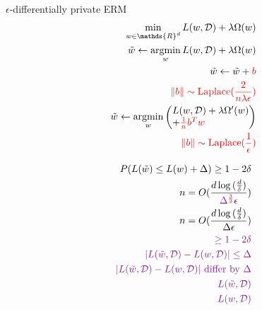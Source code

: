 \documentclass[11pt]{article}
\newcommand{\Dc}{\mathcal{D}}
\newcommand{\R}{\mathds{R}}
\DeclareMathOperator*{\argmin}{argmin}
\DeclarePairedDelimiter{\norm}{\lVert}{\rVert}
\DeclarePairedDelimiter{\abs}{\lvert}{\rvert}
\begin{document}
$\epsilon$-differentially private ERM
\begin{align*}
\min_{w\in \R^d} L(w, \Dc) + \lambda \Omega(w)\\
\tilde{w} \leftarrow \argmin_{w} L(w, \Dc) + \lambda \Omega(w)\\
\tilde{w} \leftarrow \tilde{w} +{\color{red} b}\\
\color{red}\norm{b}\sim \text{Laplace}(\frac{2}{n\lambda\epsilon})\\
\tilde{w} \leftarrow \argmin_w \begin{pmatrix*}[l]
L(w, \Dc) + \lambda \Omega'(w) \\
+{\color{red}\frac{1}{n}b^T w}
\end{pmatrix*}\\
\color{red} \norm{b}\sim \text{Laplace}(\frac{1}{\epsilon})
\end{align*}

\begin{align*}
P(L(\tilde{w}) \le L(w) + \Delta) \ge 1 - 2\delta\\
n = O(\frac{d\log{(\frac{d}{\color{Plum}\delta})}}{{\color{Plum}{\Delta}}^{\color{red}\frac{3}{2}}\epsilon})\\
n = O(\frac{d\log{(\frac{d}{\delta})}}{\Delta \epsilon})\\
\color{Plum} \ge 1 - 2\delta\\
\color{Plum} \abs{L(\tilde{w}, \Dc) - L(w, \Dc)} \le \Delta\\
\color{Plum}\abs{L(\tilde{w}, \Dc) - L(w, \Dc)} \text{ differ by } \Delta\\
\color{Plum}L(\tilde{w}, \Dc)\\
\color{Plum}L(w, \Dc)
\end{align*}
\end{document}
